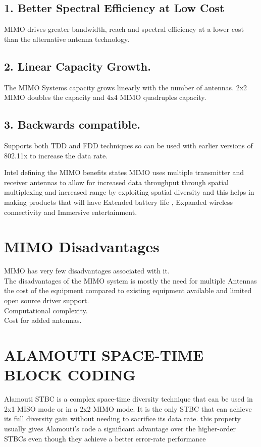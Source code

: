 \documentclass[12pt]{report}
\begin{document}
 \subsection*{1. Better Spectral Efficiency at Low Cost}
 MIMO drives greater bandwidth, reach and spectral efficiency at a lower
cost than the alternative antenna technology.

\subsection*{2. Linear Capacity Growth.}
The MIMO Systems capacity grows linearly with the number of antennas. 2x2 MIMO doubles the capacity and 4x4 MIMO quadruples
capacity.

 \subsection*{3. Backwards compatible.}
Supports both TDD and FDD techniques so can be used with earlier
versions of 802.11x to increase the data rate.

Intel defining the MIMO benefits states MIMO uses multiple transmitter and receiver antennas to allow for increased data throughput
through spatial multiplexing and increased range by exploiting spatial
diversity and this helps in making products that will have Extended
battery life , Expanded wireless connectivity and Immersive entertainment.
\section*{MIMO Disadvantages}
MIMO has very few disadvantages associated with it.\\
The disadvantages of the MIMO system is mostly the need for multiple Antennas the cost of the equipment compared to existing equipment available and limited open source driver support.\\
Computational complexity.\\
Cost for added antennas.\\


    \section*{ ALAMOUTI SPACE-TIME BLOCK CODING}
    Alamouti STBC is a complex space-time diversity
technique that can be used in 2x1 MISO mode or in a 2x2
MIMO mode. It is the only STBC that can achieve its full
diversity gain without needing to sacrifice its data rate.
this property usually gives Alamouti's code a significant
advantage over the higher-order STBCs even though they
achieve a better error-rate performance
\end{document}
